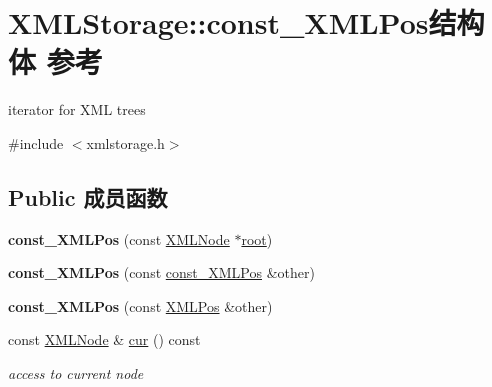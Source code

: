 \hypertarget{struct_x_m_l_storage_1_1const___x_m_l_pos}{}\section{X\+M\+L\+Storage\+:\+:const\+\_\+\+X\+M\+L\+Pos结构体 参考}
\label{struct_x_m_l_storage_1_1const___x_m_l_pos}


iterator for X\+ML trees  




{\ttfamily \#include $<$xmlstorage.\+h$>$}

\subsection*{Public 成员函数}
\begin{DoxyCompactItemize}
\item 
\mbox{\label{struct_x_m_l_storage_1_1const___x_m_l_pos_a3d357b497232bf39a736234f05a05e49}} 
{\bfseries const\+\_\+\+X\+M\+L\+Pos} (const \hyperlink{struct_x_m_l_storage_1_1_x_m_l_node}{X\+M\+L\+Node} $\ast$\hyperlink{struct__root}{root})
\item 
\mbox{\label{struct_x_m_l_storage_1_1const___x_m_l_pos_aa9c833d5503a292ad3ef461e6e846262}} 
{\bfseries const\+\_\+\+X\+M\+L\+Pos} (const \hyperlink{struct_x_m_l_storage_1_1const___x_m_l_pos}{const\+\_\+\+X\+M\+L\+Pos} \&other)
\item 
\mbox{\label{struct_x_m_l_storage_1_1const___x_m_l_pos_ac00f7d698bfb3399416ef6a82b1fccef}} 
{\bfseries const\+\_\+\+X\+M\+L\+Pos} (const \hyperlink{struct_x_m_l_storage_1_1_x_m_l_pos}{X\+M\+L\+Pos} \&other)
\item 
\mbox{\label{struct_x_m_l_storage_1_1const___x_m_l_pos_ab758877cfe49bdbae39fb6ef0ad3e1f8}} 
const \hyperlink{struct_x_m_l_storage_1_1_x_m_l_node}{X\+M\+L\+Node} \& \hyperlink{struct_x_m_l_storage_1_1const___x_m_l_pos_ab758877cfe49bdbae39fb6ef0ad3e1f8}{cur} () const
\begin{DoxyCompactList}\small\item\em access to current node \end{DoxyCompactList}\item 

\end{DoxyCompactItemize}
